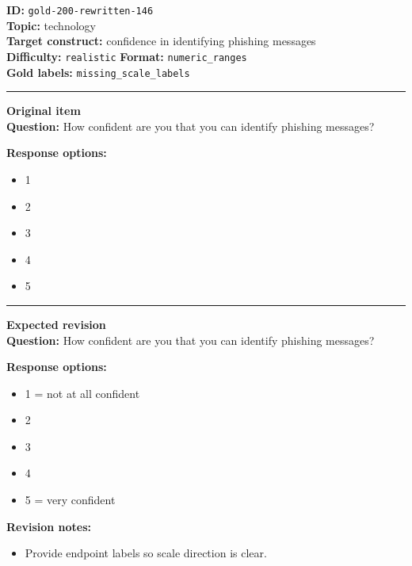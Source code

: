 \documentclass[10pt,a4paper]{article}
\newcommand{\sectionline}{\vspace{0.15em}\hrule\vspace{0.35em}}
\begin{document}
\begin{tcolorbox}[colframe=FlawRed,colback=white,colbacktitle=FlawRed!9,coltitle=black,title={Item 146\hfill Flawed item}]
\textbf{ID:} \texttt{gold-200-rewritten-146}\\
\textbf{Topic:} technology\\
\textbf{Target construct:} confidence in identifying phishing messages\\
\textbf{Difficulty:} \texttt{realistic} \quad \textbf{Format:} \texttt{numeric\_ranges}\\
\textbf{Gold labels:} \texttt{missing\_scale\_labels}\\
\sectionline
\textbf{Original item}\\
\textbf{Question:} How confident are you that you can identify phishing messages?
\par\textbf{Response options:}
\begin{itemize}
\item 1
\item 2
\item 3
\item 4
\item 5
\end{itemize}
\sectionline
\textbf{Expected revision}\\
\textbf{Question:} How confident are you that you can identify phishing messages?
\par\textbf{Response options:}
\begin{itemize}
\item 1 = not at all confident
\item 2
\item 3
\item 4
\item 5 = very confident
\end{itemize}
\par\textbf{Revision notes:}
\begin{itemize}
\item Provide endpoint labels so scale direction is clear.
\end{itemize}
\end{tcolorbox}
\end{document}
